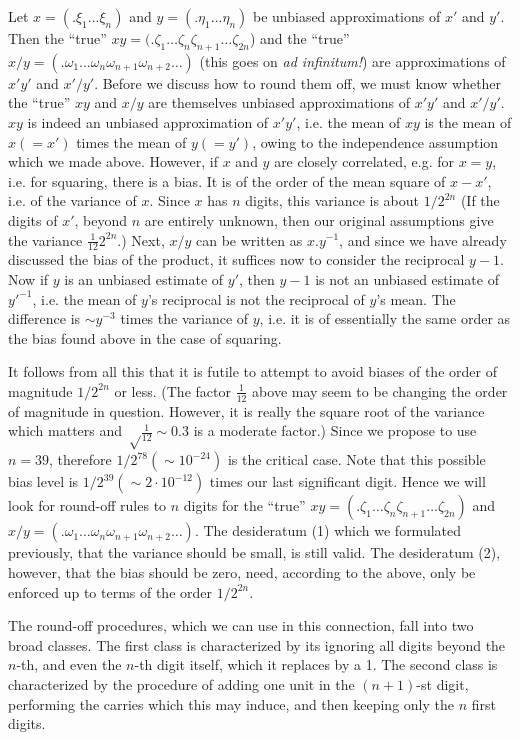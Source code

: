 \documentclass[12pt]{amsart}
\begin{document}
Let $x = (.\xi_1 ... \xi_n)$ and $y = (.\eta_1 ... \eta_n)$ be unbiased approximations of $x'$ and $y'$. Then the ``true'' $xy = (.\zeta_1 \dots \zeta_n \zeta_{n+1} \dots \zeta_{2n}$) and the ``true'' $x/y = (.\omega_1 \dots \omega_n \omega_{n+1} \omega_{n+2} \dots)$ (this goes on \emph{ad infinitum!}) are approximations of $x'y'$ and $x'/y'$. Before we discuss how to round them off, we must know whether the ``true'' $xy$ and $x/y$ are themselves unbiased approximations of $x'y'$ and $x'/y'$. $xy$ is indeed an unbiased approximation of $x'y'$, i.e. the mean of $xy$ is the mean of $x( = x')$ times the mean of $y( = y')$, owing to the independence assumption which we made above. However, if $x$ and $y$ are closely correlated, e.g. for $x = y$, i.e. for squaring, there is a bias. It is of the order of the mean square of $x - x'$, i.e. of the variance of $x$. Since $x$ has $n$ digits, this variance is about $1/2^{2n}$ (If the digits of $x'$, beyond $n$ are entirely unknown, then our original assumptions give the variance $\frac{1}{12} 2^{2n}$.) Next, $x/y$ can be written as $x.y^{-1}$, and since we have already discussed the bias of the product, it suffices now to consider the reciprocal $y - 1$. Now if $y$ is an unbiased estimate of $y'$, then $y - 1$ is not an unbiased estimate of $y'^{-1}$, i.e. the mean of $y$'s reciprocal is not the reciprocal of $y$'s mean. The difference is $\sim y^{-3}$ times the variance of $y$, i.e. it is of essentially the same order as the bias found above in the case of squaring.

It follows from all this that it is futile to attempt to avoid biases of the order of magnitude $1/2^{2n}$ or less. (The factor $\frac{1}{12}$ above may seem to be changing the order of magnitude in question. However, it is really the square root of the variance which matters and $\sqrt \frac{1}{12} \sim 0.3$ is a moderate factor.) Since we propose to use $n = 39$, therefore $1/2^{78} (\sim 10^{-24})$ is the critical case. Note that this possible bias level is $1/2^{39} (\sim 2\cdot 10^{-12})$ times our last significant digit. Hence we will look for round-off rules to $n$ digits for the ``true'' $xy = (.\zeta_1 \dots \zeta_n \zeta_{n+1} \dots \zeta_{2n})$ and $x/y = (.\omega_1 \dots \omega_{n} \omega_{n+1} \omega_{n+2} \dots)$. The desideratum (1) which we formulated previously, that the variance should be small, is still valid. The desideratum (2), however, that the bias should be zero, need, according to the above, only be enforced up to terms of the order $1/2^{2n}$.

The round-off procedures, which we can use in this connection, fall into two broad classes. The first class is characterized by its ignoring all digits beyond the $n$-th, and even the $n$-th digit itself, which it replaces by a 1. The second class is characterized by the procedure of adding one unit in the $(n + 1)$-st digit, performing the carries which this may induce, and then keeping only the $n$ first digits.
\end{document}
